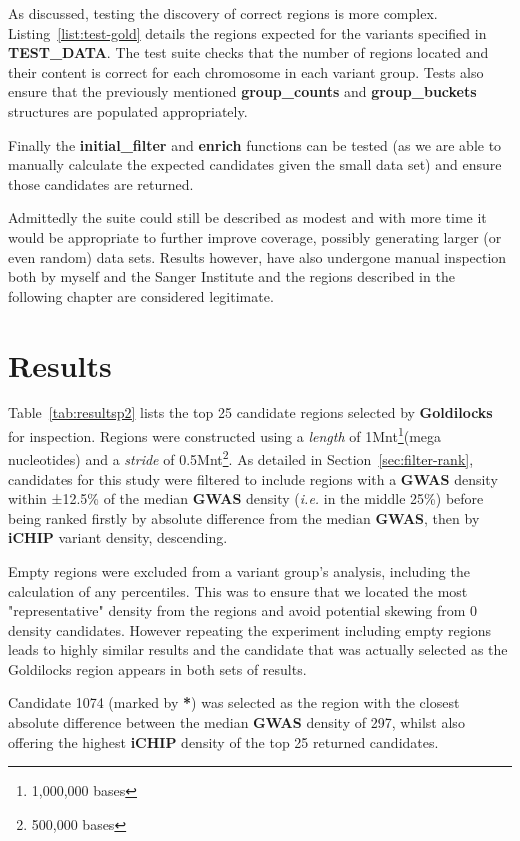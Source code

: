 As discussed, testing the discovery of correct regions is more complex.
Listing~\ref{list:test-gold} details the regions expected for the variants
specified in \textbf{TEST\_DATA}. The test suite checks that the number of
regions located and their content is correct for each chromosome in each variant
group. Tests also ensure that the previously mentioned \textbf{group\_counts}
and \textbf{group\_buckets} structures are populated appropriately.

Finally the \textbf{initial\_filter} and \textbf{enrich} functions can be tested
(as we are able to manually calculate the expected candidates given the small
data set) and ensure those candidates are returned.

Admittedly the suite could still be described as modest and with more time it
would be appropriate to further improve coverage, possibly generating larger (or
even random) data sets. Results however, have also undergone manual inspection
both by myself and the Sanger Institute and the regions described in
the following chapter are considered legitimate.


\chapter{Results}

Table~\ref{tab:resultsp2} lists the top 25 candidate regions selected by
\textbf{Goldilocks} for inspection. Regions were constructed using a
\textit{length} of 1Mnt\footnote{1,000,000 bases}(mega nucleotides) and a
\textit{stride} of 0.5Mnt\footnote{500,000 bases}. As detailed in
Section~\ref{sec:filter-rank}, candidates for this study were filtered to
include regions with a \textbf{GWAS} density within ±12.5\% of the
median \textbf{GWAS} density (\textit{i.e.} in the middle 25\%) before being
ranked firstly by absolute difference from the median \textbf{GWAS}, then by
\textbf{iCHIP} variant density, descending.

Empty regions were excluded from a variant group's analysis, including the
calculation of any percentiles. This was to ensure that we located the most
"representative" density from the regions and avoid potential skewing from 0 density
candidates. However repeating the experiment including empty regions
leads to highly similar results and the candidate that was actually selected as
the Goldilocks region appears in both sets of results.

Candidate 1074 (marked by \textbf{*}) was selected as the region with the
closest absolute difference between the median \textbf{GWAS} density of 297,
whilst also offering the highest \textbf{iCHIP} density of the top 25 returned
candidates.


